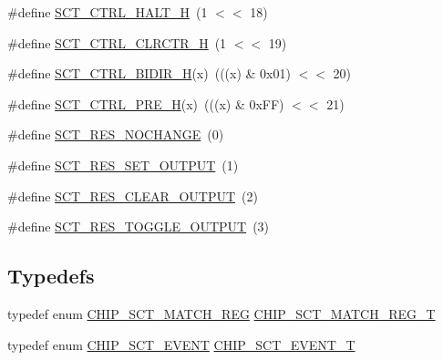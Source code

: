 \begin{DoxyCompactItemize}
\item 
\#define \hyperlink{group___s_c_t__18_x_x__43_x_x_ga19527730d0cdbf041987ab3510a0ee16}{S\+C\+T\+\_\+\+C\+T\+R\+L\+\_\+\+H\+A\+L\+T\+\_\+H}~(1 $<$$<$ 18)
\item 
\#define \hyperlink{group___s_c_t__18_x_x__43_x_x_ga792f39bf995d1a7397bb4600e44dc7f7}{S\+C\+T\+\_\+\+C\+T\+R\+L\+\_\+\+C\+L\+R\+C\+T\+R\+\_\+H}~(1 $<$$<$ 19)
\item 
\#define \hyperlink{group___s_c_t__18_x_x__43_x_x_ga9d96e3f51e16487c6f8c652cbbdc050b}{S\+C\+T\+\_\+\+C\+T\+R\+L\+\_\+\+B\+I\+D\+I\+R\+\_\+H}(x)~(((x) \& 0x01) $<$$<$ 20)
\item 
\#define \hyperlink{group___s_c_t__18_x_x__43_x_x_ga399f28b3b6a93cb14b19db3df66a565d}{S\+C\+T\+\_\+\+C\+T\+R\+L\+\_\+\+P\+R\+E\+\_\+H}(x)~(((x) \& 0x\+F\+F) $<$$<$ 21)
\item 
\#define \hyperlink{group___s_c_t__18_x_x__43_x_x_ga9f704972cc5fefff30694a1c103ee272}{S\+C\+T\+\_\+\+R\+E\+S\+\_\+\+N\+O\+C\+H\+A\+N\+GE}~(0)
\item 
\#define \hyperlink{group___s_c_t__18_x_x__43_x_x_gaf5512f6f59ea7b5b7af86a50a85408dc}{S\+C\+T\+\_\+\+R\+E\+S\+\_\+\+S\+E\+T\+\_\+\+O\+U\+T\+P\+UT}~(1)
\item 
\#define \hyperlink{group___s_c_t__18_x_x__43_x_x_gaaa994f1d7b3ec39640563bf1f3a5e2ac}{S\+C\+T\+\_\+\+R\+E\+S\+\_\+\+C\+L\+E\+A\+R\+\_\+\+O\+U\+T\+P\+UT}~(2)
\item 
\#define \hyperlink{group___s_c_t__18_x_x__43_x_x_gab7f416d617a424072cc0f29413f8e419}{S\+C\+T\+\_\+\+R\+E\+S\+\_\+\+T\+O\+G\+G\+L\+E\+\_\+\+O\+U\+T\+P\+UT}~(3)
\end{DoxyCompactItemize}
\subsection*{Typedefs}
\begin{DoxyCompactItemize}
\item 
typedef enum \hyperlink{group___s_c_t__18_x_x__43_x_x_ga642884ed46b523a1106a6505950e0259}{C\+H\+I\+P\+\_\+\+S\+C\+T\+\_\+\+M\+A\+T\+C\+H\+\_\+\+R\+EG} \hyperlink{group___s_c_t__18_x_x__43_x_x_gab0308855f6bb30035f3165d01df90e27}{C\+H\+I\+P\+\_\+\+S\+C\+T\+\_\+\+M\+A\+T\+C\+H\+\_\+\+R\+E\+G\+\_\+T}
\item 
typedef enum \hyperlink{group___s_c_t__18_x_x__43_x_x_gae9508d79393246da4eda561eff0ec9e3}{C\+H\+I\+P\+\_\+\+S\+C\+T\+\_\+\+E\+V\+E\+NT} \hyperlink{group___s_c_t__18_x_x__43_x_x_ga9c76365e19f53e676f05cb7ccec143f7}{C\+H\+I\+P\+\_\+\+S\+C\+T\+\_\+\+E\+V\+E\+N\+T\+\_\+T}
\end{DoxyCompactItemize}
